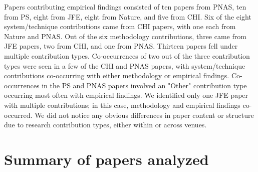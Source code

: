 Papers contributing empirical findings consisted of ten papers from PNAS, ten from
PS, eight from JFE, eight from Nature, and five from CHI. Six of the eight
system/technique contributions came from CHI papers, with one each from Nature and PNAS.
Out of the six methodology contributions, three came from JFE papers, two from
CHI, and one from PNAS. Thirteen papers fell under multiple contribution types.
Co-occurrences of two out of the three contribution types were seen in a few of
the CHI and PNAS papers, with system/technique contributions co-occurring
with either methodology or empirical findings. Co-occurrences in the PS and PNAS
papers involved an "Other" contribution type occurring most often with empirical
findings. We identified only one JFE paper with multiple contributions; in this
case, methodology and empirical findings co-occurred. We did not notice any
obvious differences in paper content or structure due to research contribution
types, either within or across venues.

\section{Summary of papers analyzed}
\tableContributions

% 
% 